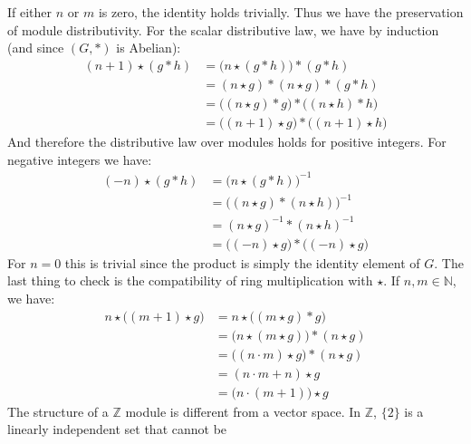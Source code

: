     If either $n$ or $m$ is zero, the identity holds trivially. Thus we have the
    preservation of module distributivity. For the scalar distributive law, we
    have by induction (and since $(G,*)$ is Abelian):
    \begin{subequations}
        \begin{align}
            (n+1)\star(g*h)
            &=\big(n\star(g*h)\big)*(g*h)\\
            &=(n\star{g})*(n\star{g})*(g*h)\\
            &=\big((n\star{g})*g\big)*\big((n\star{h})*h\big)\\
            &=\big((n+1)\star{g}\big)*\big((n+1)\star{h}\big)
        \end{align}
    \end{subequations}
    And therefore the distributive law over modules holds for positive integers.
    For negative integers we have:
    \begin{subequations}
        \begin{align}
            (\minus{n})\star(g*h)
            &=\big(n\star(g*h)\big)^{\minus{1}}\\
            &=\big((n\star{g})*(n\star{h})\big)^{\minus{1}}\\
            &=(n\star{g})^{\minus{1}}*(n\star{h})^{\minus{1}}\\
            &=\big((\minus{n})\star{g}\big)*\big((\minus{n})\star{g}\big)
        \end{align}
    \end{subequations}
    For $n=0$ this is trivial since the product is simply the identity element
    of $G$. The last thing to check is the compatibility of ring multiplication
    with $\star$. If $n,m\in\mathbb{N}$, we have:
    \begin{subequations}
        \begin{align}
            n\star\big((m+1)\star{g}\big)
            &=n\star\big((m\star{g})*g\big)\\
            &=\big(n\star(m\star{g})\big)*(n\star{g})\\
            &=\big((n\cdot{m})\star{g}\big)*(n\star{g})\\
            &=(n\cdot{m}+n)\star{g}\\
            &=\big(n\cdot(m+1)\big)\star{g}
        \end{align}
    \end{subequations}
    The structure of a $\mathbb{Z}$ module is different from a vector space.
    In $\mathbb{Z}$, $\{2\}$ is a linearly independent set that cannot be
